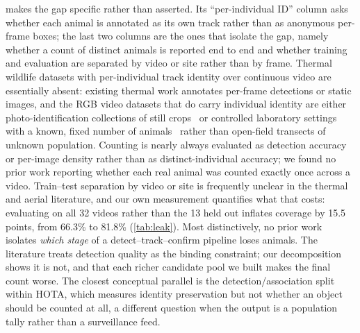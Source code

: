  makes the gap specific rather than asserted. Its ``per-individual ID''
column asks whether each animal is annotated as its own track rather than as anonymous
per-frame boxes; the last two columns are
the ones that isolate the gap, namely whether a count of distinct animals is reported end to
end and whether training and evaluation are separated by video or site rather than by frame. Thermal wildlife datasets with
per-individual track identity over continuous video are essentially absent: existing thermal
work annotates per-frame detections or static images, and the RGB video datasets that do carry
individual identity are either photo-identification collections of still
crops~\cite{adam2025wildlifereid10k} or controlled laboratory settings with a known, fixed
number of animals~\cite{dolokov2023upper} rather than open-field transects of unknown
population. Counting is nearly always evaluated as detection accuracy or per-image density
rather than as distinct-individual accuracy; we found no prior work reporting whether each real
animal was counted exactly once across a video. Train--test separation by video or site is
frequently unclear in the thermal and aerial literature, and our own measurement quantifies what that costs: evaluating on all 32 videos rather than the 13 held out inflates coverage
by 15.5 points, from 66.3\% to 81.8\% (\cref{tab:leak}). Most distinctively, no prior work
isolates \emph{which stage} of a detect--track--confirm pipeline loses animals. The literature
treats detection quality as the binding constraint; our decomposition shows it is not, and that each richer candidate pool we built makes the final count worse. The
closest conceptual parallel is the detection/association split within HOTA, which measures
identity preservation but not whether an object should be counted at all, a different
question when the output is a population tally rather than a surveillance feed.
